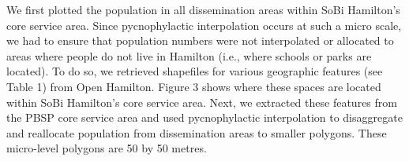\documentclass[]{elsarticle} %
\begin{document}
We first plotted the population in all dissemination areas within SoBi
Hamilton's core service area. Since pycnophylactic interpolation occurs
at such a micro scale, we had to ensure that population numbers were not
interpolated or allocated to areas where people do not live in Hamilton
(i.e., where schools or parks are located). To do so, we retrieved
shapefiles for various geographic features (see Table 1) from Open
Hamilton. Figure 3 shows where these spaces are located within SoBi
Hamilton's core service area. Next, we extracted these features from the
PBSP core service area and used pycnophylactic interpolation to
disaggregate and reallocate population from dissemination areas to
smaller polygons. These micro-level polygons are 50 by 50 metres.

\begin{table}


\end{table}
\end{document}
